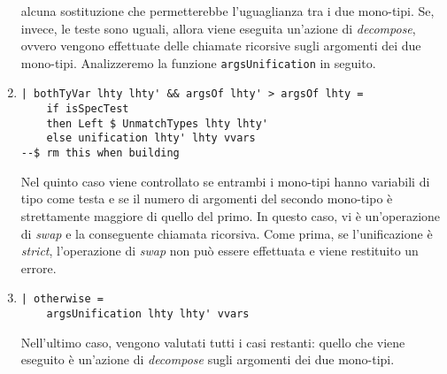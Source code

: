 \documentclass[10pt,a4paper]{article}
\begin{document}
\begin{enumerate}
    alcuna sostituzione che permetterebbe l'uguaglianza tra i due mono-tipi. Se, invece, le teste sono uguali, allora
    viene eseguita un'azione di \textit{decompose}, ovvero vengono effettuate delle chiamate ricorsive sugli argomenti
    dei due mono-tipi. Analizzeremo la funzione \texttt{argsUnification} in seguito.
    \item
    \begin{lstlisting}
| bothTyVar lhty lhty' && argsOf lhty' > argsOf lhty =
    if isSpecTest
    then Left $ UnmatchTypes lhty lhty'
    else unification lhty' lhty vvars
--$ rm this when building
    \end{lstlisting}
    Nel quinto caso viene controllato se entrambi i mono-tipi hanno variabili di tipo come testa e se il numero di
    argomenti del secondo mono-tipo è strettamente maggiore di quello del primo. In questo caso, vi è un'operazione
    di \textit{swap} e la conseguente chiamata ricorsiva. Come prima, se l'unificazione è \textit{strict},
    l'operazione di \textit{swap} non può essere effettuata e viene restituito un errore.
    \item
    \begin{lstlisting}
| otherwise =
    argsUnification lhty lhty' vvars
    \end{lstlisting}
    Nell'ultimo caso, vengono valutati tutti i casi restanti: quello che viene eseguito è un'azione di \textit{decompose}
    sugli argomenti dei due mono-tipi.
\end{enumerate}
\end{document}
